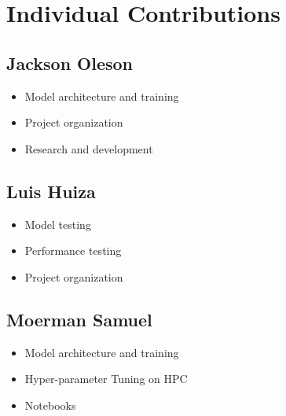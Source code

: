 \documentclass[conference]{IEEEtran}
\begin{document}

\section{Individual Contributions}
\subsection{Jackson Oleson}
\begin{itemize}
    \item Model architecture and training
    \item Project organization
    \item Research and development
\end{itemize}
\subsection{Luis Huiza}
\begin{itemize}
    \item Model testing
    \item Performance testing
    \item Project organization
\end{itemize}
\subsection{Moerman Samuel}
\begin{itemize}
    \item Model architecture and training
    \item Hyper-parameter Tuning on HPC
    \item Notebooks
\end{itemize}







\end{document}
